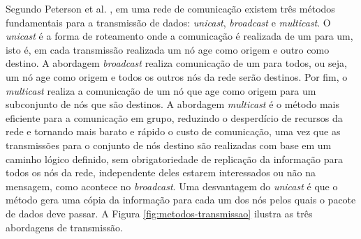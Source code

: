 Segundo  Peterson  et  al.    \cite{Peterson:2011},  em  uma  rede  de
comunicação existem  três métodos  fundamentais para a  transmissão de
dados: \textit{unicast},  \textit{broadcast} e  \textit{multicast}.  O
\textit{unicast}  é  a  forma  de  roteamento  onde  a  comunicação  é
realizada de um  para um, isto é, em cada  transmissão realizada um nó
age como origem e outro  como destino.  A abordagem \textit{broadcast}
realiza comunicação de um para todos, ou seja, um nó age como origem e
todos   os  outros   nós  da   rede  serão   destinos.   Por   fim,  o
\textit{multicast} realiza a comunicação de  um nó que age como origem
para  um   subconjunto  de   nós  que   são  destinos.    A  abordagem
\textit{multicast} é  o método  mais eficiente  para a  comunicação em
grupo, reduzindo  o desperdício  de recursos da  rede e  tornando mais
barato e  rápido o custo de  comunicação, uma vez que  as transmissões
para o conjunto  de nós destino são realizadas com  base em um caminho
lógico definido, sem obrigatoriedade  de replicação da informação para
todos os nós  da rede, independente deles estarem  interessados ou não
na mensagem, como acontece no {\em broadcast}. Uma desvantagem do {\em
  unicast} é  que o método gera  uma cópia da informação  para cada um
dos  nós  pelos  quais  o  pacote de  dados  deve  passar.   A  Figura
\ref{fig:metodos-transmissao}   ilustra   as    três   abordagens   de
transmissão.


